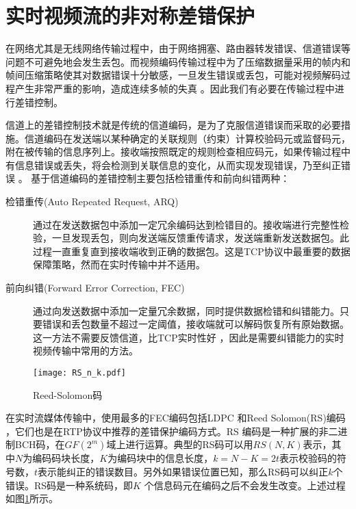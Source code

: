 \section{实时视频流的非对称差错保护}
\label{section:fec_intro}
在网络尤其是无线网络传输过程中，由于网络拥塞、路由器转发错误、信道错误等问题不可避免地会发生丢包。而视频编码传输过程中为了压缩数据量采用的帧内和帧间压缩策略使其对数据错误十分敏感，一旦发生错误或丢包，可能对视频解码过程产生非常严重的影响，造成连续多帧的失真 \cite{stockhammer2003h}。因此我们有必要在传输过程中进行差错控制。

信道上的差错控制技术就是传统的信道编码，是为了克服信道错误而采取的必要措施。信道编码在发送端以某种确定的关联规则（约束）计算校验码元或监督码元，附在被传输的信息序列上。接收端按照既定的规则检查相应码元，如果传输过程中有信息错误或丢失，将会检测到关联信息的变化，从而实现发现错误，乃至纠正错误 \cite{陈敏2004网络实时视频传输研究, wang1998error, wang2000error} 。
基于信道编码的差错控制主要包括检错重传和前向纠错两种：
\begin{description}
    \item[检错重传(Auto Repeated Request, ARQ) \cite{soltani2009delay, schier2012optimizing}] 通过在发送数据包中添加一定冗余编码达到检错目的。接收端进行完整性检验，一旦发现丢包，则向发送端反馈重传请求，发送端重新发送数据包。此过程一直重复直到接收端收到正确的数据包。这是TCP协议中最重要的数据保障策略，然而在实时传输中并不适用。
    \item[前向纠错(Forward Error Correction, FEC) \cite{nafaa2008forward}] 通过向发送数据中添加一定量冗余数据，同时提供数据检错和纠错能力。只要错误和丢包数量不超过一定阈值，接收端就可以解码恢复所有原始数据。这一方法不需要反馈信道，比TCP实时性好 \cite{davis1996joint}，因此是需要纠错能力的实时视频传输中常用的方法。
\end{description}

\begin{figure}[htbp]
  \centering
  \texttt{[image: RS\_n\_k.pdf]}
  \caption{Reed-Solomon码}
  \label{fig:RS_n_k}
\end{figure}

在实时流媒体传输中，使用最多的FEC编码包括LDPC \cite{richardson2003error}和Reed Solomon(RS)编码 \cite{wicker1999reed}，它们也是在RTP协议中推荐的差错保护编码方式。RS 编码是一种扩展的非二进制BCH码，在$GF(2^m)$域上进行运算。典型的RS码可以用$RS(N,K)$表示，其中$N$为编码码块长度，$K$为编码块中的信息长度，$k=N-K=2t$表示校验码的符号数，$t$表示能纠正的错误数目。另外如果错误位置已知，那么RS码可以纠正$k$个错误。RS码是一种系统码，即$K$ 个信息码元在编码之后不会发生改变。上述过程如图\ref{fig:RS_n_k}所示。

